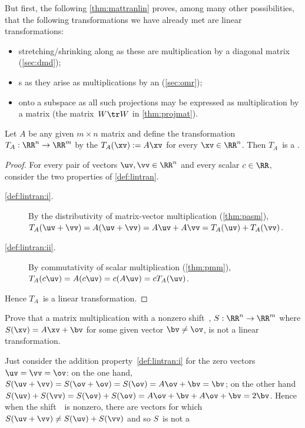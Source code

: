 \begin{example} 
But first, the following \cref{thm:mattranlin} proves, among many other possibilities, that the following transformations we have already met are linear transformations:
\begin{itemize}
\item stretching\slash shrinking along  as these are multiplication by a diagonal matrix (\cref{sec:dmd});
\item {}s as they arise as multiplications by an  (\cref{sec:omr});
\item {} onto a subspace as all such projections may be expressed as multiplication by a matrix (the matrix~\(W\tr W\) in \cref{thm:projmat}).
\end{itemize}
\end{example}


\begin{theorem} \label{thm:mattranlin} 
Let \(A\) be any given \(m\times n\) matrix and define the transformation \(T_A:\RR^n\to\RR^m\)  by the  \(T_A(\xv):=A\xv\) for every \(\xv\in\RR^n\). 
Then \(T_A\)~is a .
\end{theorem}
\begin{proof} 
For every pair of vectors \(\uv,\vv\in\RR^n\) and every scalar \(c\in\RR\), consider the two properties of \cref{def:lintran}.
\begin{description}
\item[\ref{def:lintran:i}.] By the distributivity of matrix-vector multiplication (\cref{thm:pasm}), \(T_A(\uv+\vv)=A(\uv+\vv)=A\uv+A\vv=T_A(\uv)+T_A(\vv)\).
\item[\ref{def:lintran:ii}.] By commutativity of scalar multiplication (\cref{thm:pmm}), \(T_A(c\uv)=A(c\uv)=c(A\uv)=cT_A(\uv)\).
\end{description}
Hence \(T_A\)~is a linear transformation.
\end{proof}



\begin{example} 
Prove that a matrix multiplication with a nonzero shift~\bv, \(S:\RR^n\to\RR^m\) where \(S(\xv)=A\xv+\bv\) for some given vector \(\bv\neq\ov\), is not a linear transformation.
\begin{solution} 
Just consider the addition property~\ref{def:lintran:i} for the zero vectors \(\uv=\vv=\ov\):  
on the one hand, \(S(\uv+\vv)=S(\ov+\ov)=S(\ov)=A\ov+\bv=\bv\); 
on the other hand \(S(\uv)+S(\vv)=S(\ov)+S(\ov)=A\ov+\bv+A\ov+\bv=2\bv\).  
Hence when the shift~\bv\ is nonzero, there are vectors for which \(S(\uv+\vv)\neq S(\uv)+S(\vv)\) and so \(S\)~is not a 
\end{solution}
\end{example}



